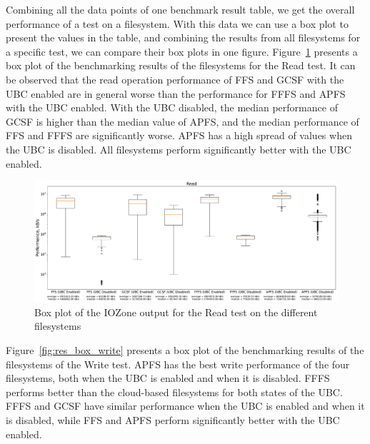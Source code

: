 Combining all the data points of one benchmark result table, we get the overall performance of a test on a filesystem. With this data we can use a box plot to present the values in the table, and combining the results from all filesystems for a specific test, we can compare their box plots in one figure. Figure~\ref{fig:res_box_read} presents a box plot of the benchmarking results of the filesystems for the Read test. It can be observed that the read operation performance of \gls{FFS} and \gls{GCSF} with the \gls{UBC} enabled are in general worse than the performance for \gls{FFFS} and \gls{APFS} with the \gls{UBC} enabled. With the \gls{UBC} disabled, the median performance of \gls{GCSF} is higher than the median value of \gls{APFS}, and the median performance of \gls{FFS} and \gls{FFFS} are significantly worse. \gls{APFS} has a high spread of values when the \gls{UBC} is disabled. All filesystems perform significantly better with the \gls{UBC} enabled.

\begin{figure}[!ht]
	\label{fig:res_box_read}
	\begin{center}
		\includegraphics[width=1.0\textwidth]{figures.nosync/benchmarking/Read-boxplot.pdf}
	\end{center}
	\caption{Box plot of the IOZone output for the Read test on the different filesystems}
\end{figure}

\FloatBarrier

Figure~\ref{fig:res_box_write} presents a box plot of the benchmarking results of the filesystems of the Write test. \gls{APFS} has the best write performance of the four filesystems, both when the \gls{UBC} is enabled and when it is disabled. \gls{FFFS} performs better than the \mbox{cloud-based} filesystems for both states of the \gls{UBC}. \gls{FFFS} and \gls{GCSF} have similar performance when the \gls{UBC} is enabled and when it is disabled, while \gls{FFS} and \gls{APFS} perform significantly better with the \gls{UBC} enabled.

